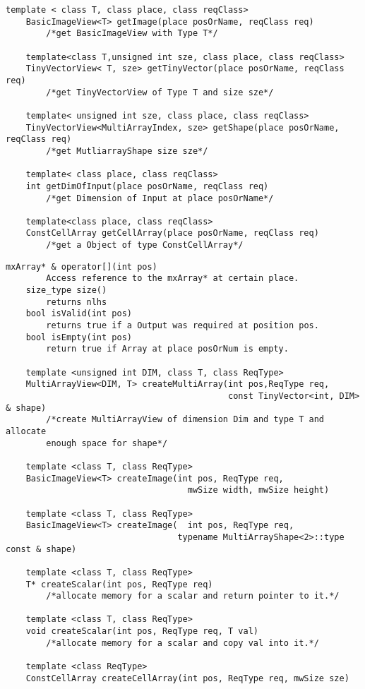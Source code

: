 \documentclass[a4paper,10pt]{article}
\begin{document}
\begin{lstlisting}[caption={matlab::InputArray}]
	template < class T, class place, class reqClass>
	BasicImageView<T> getImage(place posOrName, reqClass req)
		/*get BasicImageView with Type T*/

	template<class T,unsigned int sze, class place, class reqClass>
	TinyVectorView< T, sze> getTinyVector(place posOrName, reqClass req)
		/*get TinyVectorView of Type T and size sze*/

	template< unsigned int sze, class place, class reqClass>
	TinyVectorView<MultiArrayIndex, sze> getShape(place posOrName, reqClass req)
		/*get MutliarrayShape size sze*/

	template< class place, class reqClass>
	int getDimOfInput(place posOrName, reqClass req)
		/*get Dimension of Input at place posOrName*/

	template<class place, class reqClass>
	ConstCellArray getCellArray(place posOrName, reqClass req)
		/*get a Object of type ConstCellArray*/
\end{lstlisting}
\begin{lstlisting}[caption={matlab::OutputArray}]
	mxArray* & operator[](int pos)
		Access reference to the mxArray* at certain place.
	size_type size()
		returns nlhs
	bool isValid(int pos)
		returns true if a Output was required at position pos.
	bool isEmpty(int pos)
		return true if Array at place posOrNum is empty.	

	template <unsigned int DIM, class T, class ReqType>
	MultiArrayView<DIM, T> createMultiArray(int pos,ReqType req,
                                            const TinyVector<int, DIM>  & shape)
		/*create MultiArrayView of dimension Dim and type T and allocate 
		enough space for shape*/

	template <class T, class ReqType>
	BasicImageView<T> createImage(int pos, ReqType req,
                                    mwSize width, mwSize height)

	template <class T, class ReqType>
	BasicImageView<T> createImage(  int pos, ReqType req,
                                  typename MultiArrayShape<2>::type const & shape)

	template <class T, class ReqType>
	T* createScalar(int pos, ReqType req)
		/*allocate memory for a scalar and return pointer to it.*/

	template <class T, class ReqType>
	void createScalar(int pos, ReqType req, T val)
		/*allocate memory for a scalar and copy val into it.*/

	template <class ReqType>
	ConstCellArray createCellArray(int pos, ReqType req, mwSize sze)
\end{lstlisting}
\end{document}
